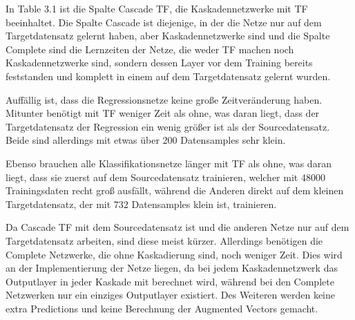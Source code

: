 In Table 3.1 ist die Spalte Cascade TF, die Kaskadennetzwerke mit TF beeinhaltet. Die Spalte Cascade ist diejenige, in der die Netze nur auf dem 
Targetdatensatz gelernt haben, aber Kaskadennetzwerke sind und die Spalte Complete sind die Lernzeiten der Netze, die weder TF machen noch 
Kaskadennetzwerke sind, sondern dessen Layer vor dem Training bereits feststanden und komplett in einem auf dem Targetdatensatz gelernt wurden. 

Auffällig ist, dass die Regressionsnetze keine große Zeitveränderung haben. Mitunter benötigt mit TF weniger Zeit als ohne, was daran liegt, dass 
der Targetdatensatz der Regression ein wenig größer ist als der Sourcedatensatz. Beide sind allerdings mit etwas über 200 Datensamples sehr klein. 

Ebenso brauchen alle Klassifikationsnetze länger mit TF als ohne, was daran liegt, dass sie zuerst auf dem Sourcedatensatz trainieren, welcher mit 
48000 Trainingsdaten recht groß ausfällt, während die Anderen direkt auf dem kleinen Targetdatensatz, der mit 732 Datensamples klein ist, 
trainieren. 

Da Cascade TF mit dem Sourcedatensatz ist und die anderen Netze nur auf dem Targetdatensatz arbeiten, sind diese meist kürzer. Allerdings 
benötigen die Complete Netzwerke, die ohne Kaskadierung sind, noch weniger Zeit. Dies wird an der Implementierung der Netze liegen, da bei jedem 
Kaskadennetzwerk das Outputlayer in jeder Kaskade mit berechnet wird, während bei den Complete Netzwerken nur ein einziges Outputlayer existiert. 
Des Weiteren werden keine extra Predictions und keine Berechnung der Augmented Vectors gemacht. 
